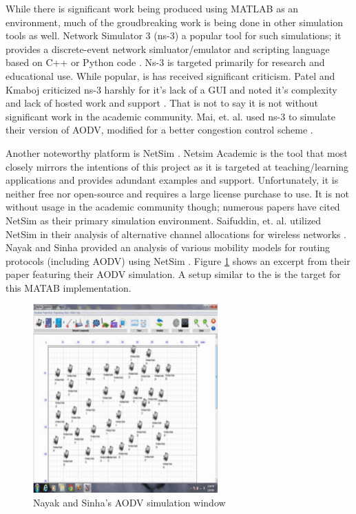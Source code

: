 \documentclass[conference]{IEEEtran}
\begin{document}
While there is significant work being produced using MATLAB as an environment, much of the groudbreaking work is being done in other simulation tools as well. Network Simulator 3 (ns-3) a popular tool for such simulations; it provides a discrete-event network simluator/emulator and scripting language based on C++ or Python code \cite{ns3}. Ns-3 is targeted primarily for research and educational use. While popular, is has received significant criticism. Patel and Kmaboj criticized ns-3 harshly for it's lack of a GUI and noted it's complexity and lack of hosted work and support \cite{ns3_criticism}. That is not to say it is not without significant work in the academic community. Mai, et. al. used ns-3 to simulate their version of AODV, modified for a better congestion control scheme \cite{aodv_in_ns3}.

Another noteworthy platform is NetSim \cite{netsim}. Netsim Academic is the tool that most closely mirrors the intentions of this project as it is targeted at teaching/learning applications and provides adundant examples and support. Unfortunately, it is neither free nor open-source and requires a large license purchase to use. It is not without usage in the academic community though; numerous papers have cited NetSim as their primary simulation environment. Saifuddin, et. al. utilized NetSim in their analysis of alternative channel allocations for wireless networks \cite{netsim_spectrum}.  Nayak and Sinha provided an analysis of various mobility models for routing protocols (including AODV) using NetSim \cite{netsim_mobility}. Figure \ref{fig:netsim_example} shows an excerpt from their paper featuring their AODV simulation. A setup similar to the is the target for this MATAB implementation.

\begin{figure}[ht]
	\centering
 	\includegraphics[width=2.79in]{netsim_example.png}
	\caption{Nayak and Sinha's AODV simulation window \cite{netsim_mobility}}
	\label{fig:netsim_example}
\end{figure}
\end{document}
